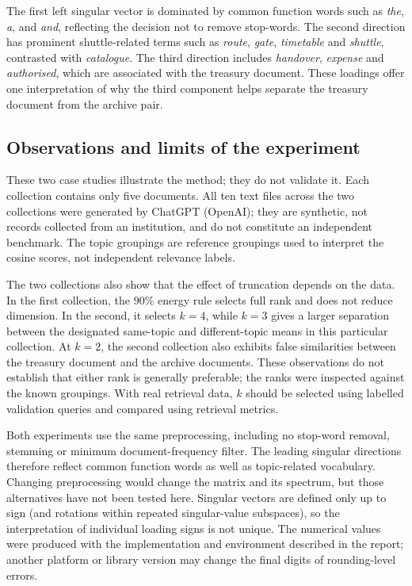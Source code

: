 \documentclass[12pt,a4paper]{report}
\theoremstyle{plain}
\theoremstyle{definition}
\theoremstyle{remark}
\theoremstyle{definition}
\begin{document}
The first left singular vector is dominated by common function words such as \emph{the}, \emph{a}, and \emph{and}, reflecting the decision not to remove stop-words. The second direction has prominent shuttle-related terms such as \emph{route}, \emph{gate}, \emph{timetable} and \emph{shuttle}, contrasted with \emph{catalogue}. The third direction includes \emph{handover}, \emph{expense} and \emph{authorised}, which are associated with the treasury document. These loadings offer one interpretation of why the third component helps separate the treasury document from the archive pair.

\subsection{Observations and limits of the experiment}

These two case studies illustrate the method; they do not validate it. Each collection contains only five documents. All ten text files across the two collections were generated by ChatGPT (OpenAI); they are synthetic, not records collected from an institution, and do not constitute an independent benchmark. The topic groupings are reference groupings used to interpret the cosine scores, not independent relevance labels.

The two collections also show that the effect of truncation depends on the data. In the first collection, the 90\% energy rule selects full rank and does not reduce dimension. In the second, it selects $k=4$, while $k=3$ gives a larger separation between the designated same-topic and different-topic means in this particular collection. At $k=2$, the second collection also exhibits false similarities between the treasury document and the archive documents. These observations do not establish that either rank is generally preferable; the ranks were inspected against the known groupings. With real retrieval data, $k$ should be selected using labelled validation queries and compared using retrieval metrics.

Both experiments use the same preprocessing, including no stop-word removal, stemming or minimum document-frequency filter. The leading singular directions therefore reflect common function words as well as topic-related vocabulary. Changing preprocessing would change the matrix and its spectrum, but those alternatives have not been tested here. Singular vectors are defined only up to sign (and rotations within repeated singular-value subspaces), so the interpretation of individual loading signs is not unique. The numerical values were produced with the implementation and environment described in the report; another platform or library version may change the final digits of rounding-level errors.
\end{document}
